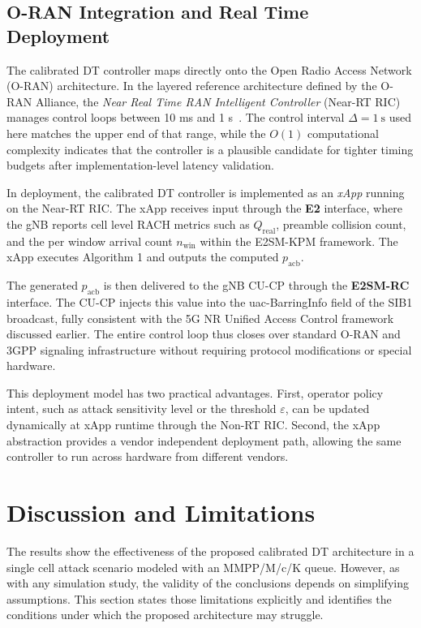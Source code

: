 \documentclass[conference]{IEEEtran}
\newcommand{\qreal}{Q_{\mathrm{real}}}
\newcommand{\pacb}{p_{\mathrm{acb}}}
\begin{document}
\subsection{O-RAN Integration and Real Time Deployment}

The calibrated DT controller maps directly onto the Open Radio Access Network (O-RAN) architecture. In the layered reference architecture defined by the O-RAN Alliance, the \emph{Near Real Time RAN Intelligent Controller} (Near-RT RIC) manages control loops between 10 ms and 1 s~\cite{b14}. The control interval $\Delta = 1\ \mathrm{s}$ used here matches the upper end of that range, while the $O(1)$ computational complexity indicates that the controller is a plausible candidate for tighter timing budgets after implementation-level latency validation.

In deployment, the calibrated DT controller is implemented as an \emph{xApp} running on the Near-RT RIC. The xApp receives input through the \textbf{E2} interface, where the gNB reports cell level RACH metrics such as $\qreal$, preamble collision count, and the per window arrival count $n_{\mathrm{win}}$ within the E2SM-KPM framework. The xApp executes Algorithm 1 and outputs the computed $\pacb$.

The generated $\pacb$ is then delivered to the gNB CU-CP through the \textbf{E2SM-RC} interface. The CU-CP injects this value into the uac-BarringInfo field of the SIB1 broadcast, fully consistent with the 5G NR Unified Access Control framework discussed earlier. The entire control loop thus closes over standard O-RAN and 3GPP signaling infrastructure without requiring protocol modifications or special hardware.

This deployment model has two practical advantages. First, operator policy intent, such as attack sensitivity level or the threshold $\varepsilon$, can be updated dynamically at xApp runtime through the Non-RT RIC. Second, the xApp abstraction provides a vendor independent deployment path, allowing the same controller to run across hardware from different vendors.

\section{Discussion and Limitations}

The results show the effectiveness of the proposed calibrated DT architecture in a single cell attack scenario modeled with an MMPP/M/c/K queue. However, as with any simulation study, the validity of the conclusions depends on simplifying assumptions. This section states those limitations explicitly and identifies the conditions under which the proposed architecture may struggle.
\end{document}
